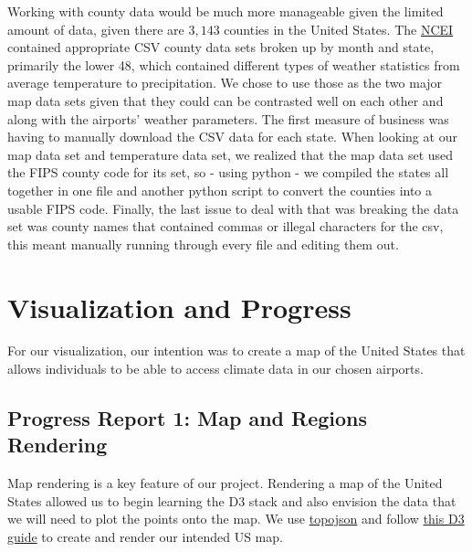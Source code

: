 \documentclass[9pt,twocolumn,twoside]{opticajnl}
\begin{document}
Working with county data would be much more manageable given the limited amount of data, given there are $3,143$ counties in the United States. The \href{https://www.ncei.noaa.gov}{NCEI} contained appropriate CSV county data sets broken up by month and state, primarily the lower 48, which contained different types of weather statistics from average temperature to precipitation. We chose to use those as the two major map data sets given that they could can be contrasted well on each other and along with the airports' weather parameters. The first measure of business was having to manually download the CSV data for each state. When looking at our map data set and temperature data set, we realized that the map data set used the FIPS county code for its set, so - using python - we compiled the states all together in one file and another python script to convert the counties into a usable FIPS code. Finally, the last issue to deal with that was breaking the data set was county names that contained commas or illegal characters for the csv, this meant manually running through every file and editing them out.

\section {Visualization and Progress}

For our visualization, our intention was to create a map of the United States that allows individuals to be able to access climate data in our chosen airports. 

\subsection{Progress Report 1: Map and Regions Rendering}

Map rendering is a key feature of our project. Rendering a map of the United States allowed us to begin learning the D3 stack and also envision the data that we will need to plot the points onto the map. We use \href{https://github.com/topojson/topojson}{topojson} and follow \href{https://observablehq.com/@d3/u-s-map}{this D3 guide} to create and render our intended US map.
\end{document}
